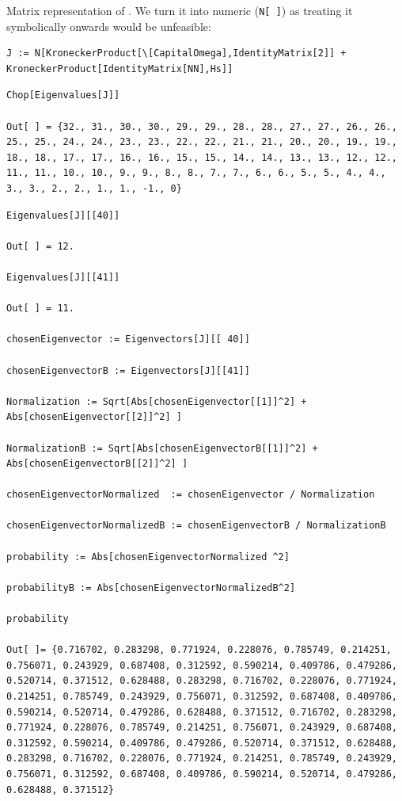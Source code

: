 Matrix representation of \cite[Eq. 1]{Lloyd:Time}.
We turn it into numeric (\verb!N[ ]!) as treating  it symbolically onwards would be unfeasible:
\begin{lstlisting}
J := N[KroneckerProduct[\[CapitalOmega],IdentityMatrix[2]] + KroneckerProduct[IdentityMatrix[NN],Hs]]
\end{lstlisting}
\begin{lstlisting}
Chop[Eigenvalues[J]]

Out[ ] = {32., 31., 30., 30., 29., 29., 28., 28., 27., 27., 26., 26., 25., 25., 24., 24., 23., 23., 22., 22., 21., 21., 20., 20., 19., 19., 18., 18., 17., 17., 16., 16., 15., 15., 14., 14., 13., 13., 12., 12., 11., 11., 10., 10., 9., 9., 8., 8., 7., 7., 6., 6., 5., 5., 4., 4., 3., 3., 2., 2., 1., 1., -1., 0}
\end{lstlisting}
\begin{lstlisting}
Eigenvalues[J][[40]]

Out[ ] = 12.

Eigenvalues[J][[41]]

Out[ ] = 11.

chosenEigenvector := Eigenvectors[J][[ 40]]

chosenEigenvectorB := Eigenvectors[J][[41]]

Normalization := Sqrt[Abs[chosenEigenvector[[1]]^2] + Abs[chosenEigenvector[[2]]^2] ]

NormalizationB := Sqrt[Abs[chosenEigenvectorB[[1]]^2] + Abs[chosenEigenvectorB[[2]]^2] ]

chosenEigenvectorNormalized  := chosenEigenvector / Normalization

chosenEigenvectorNormalizedB := chosenEigenvectorB / NormalizationB  

probability := Abs[chosenEigenvectorNormalized ^2]

probabilityB := Abs[chosenEigenvectorNormalizedB^2]

probability

Out[ ]= {0.716702, 0.283298, 0.771924, 0.228076, 0.785749, 0.214251, 0.756071, 0.243929, 0.687408, 0.312592, 0.590214, 0.409786, 0.479286, 0.520714, 0.371512, 0.628488, 0.283298, 0.716702, 0.228076, 0.771924, 0.214251, 0.785749, 0.243929, 0.756071, 0.312592, 0.687408, 0.409786, 0.590214, 0.520714, 0.479286, 0.628488, 0.371512, 0.716702, 0.283298, 0.771924, 0.228076, 0.785749, 0.214251, 0.756071, 0.243929, 0.687408, 0.312592, 0.590214, 0.409786, 0.479286, 0.520714, 0.371512, 0.628488, 0.283298, 0.716702, 0.228076, 0.771924, 0.214251, 0.785749, 0.243929, 0.756071, 0.312592, 0.687408, 0.409786, 0.590214, 0.520714, 0.479286, 0.628488, 0.371512}


\end{lstlisting}
